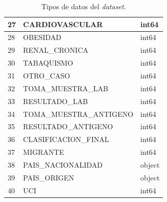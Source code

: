 \begin{table}[h]
{\begin{tabular}{|l|l|l|}
27 & CARDIOVASCULAR          & int64      \\ \hline
28 & OBESIDAD                & int64      \\ \hline
29 & RENAL\_CRONICA          & int64      \\ \hline
30 & TABAQUISMO              & int64      \\ \hline
31 & OTRO\_CASO              & int64      \\ \hline
32 & TOMA\_MUESTRA\_LAB      & int64      \\ \hline
33 & RESULTADO\_LAB          & int64      \\ \hline
34 & TOMA\_MUESTRA\_ANTIGENO & int64      \\ \hline
35 & RESULTADO\_ANTIGENO     & int64      \\ \hline
36 & CLASIFICACION\_FINAL    & int64      \\ \hline
37 & MIGRANTE                & int64      \\ \hline
38 & PAIS\_NACIONALIDAD      & object     \\ \hline
39 & PAIS\_ORIGEN            & object     \\ \hline
40 & UCI                     & int64      \\ \hline
\end{tabular}
}
\caption{Tipos de datos del \emph{dataset}.}
\label{tabla:datatype}
\end{table}

\clearpage

